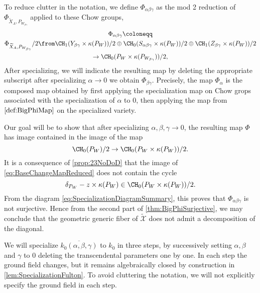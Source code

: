 To reduce clutter in the notation, we define $\Phi_{\alpha \beta \gamma}$ as the mod 2 reduction of $\Phi_{\widetilde{X}_A,P_{W_{\beta \gamma}}}$ applied to these Chow groups,
\begin{multline*}
   \Phi_{\alpha \beta \gamma} \coloneqq\\
\Phi_{\widetilde{X}_A,P_{W_{\beta \gamma}}}/2 \from \CH_1(Y_{\beta \gamma} \times \kappa(P_W))/2 \oplus \CH_0(S_{\alpha \beta \gamma}  \times \kappa(P_W))/2 \oplus \CH_1(Z_{\beta \gamma} \times \kappa(P_W))/2\\ 
\to \CH_0(P_W  \times \kappa(P_{W_{\beta \gamma}}))/2,
\end{multline*}
After specializing, we will indicate the resulting map by deleting the appropriate subscript \eg after specializing $\alpha \to 0$ we obtain $\Phi_{\beta \gamma}$. Precisely, the map $\Phi_\alpha$ is the composed map obtained by first applying the specialization map on Chow grops associated with the specialization of $\alpha$ to $0$, then applying the map from $\cref{def:BigPhiMap}$ on the specialized variety.

Our goal will be to show that after specializing $\alpha, \beta, \gamma \to 0$, the resulting map $\Phi$ has image contained in the image of the map
\begin{equation}
  \label{eq:BaseChangeMapReduced}
  \CH_0(P_W)/2 \to \CH_0(P_W \times \kappa(P_W))/2.
\end{equation}
It is a consequence of \cref{prop:23NoDoD} that the image of \eqref{eq:BaseChangeMapReduced} does not contain the cycle
\begin{equation}
  \label{eq:DiagonalCycle1}
  \delta_{P_W} - z \times \kappa(P_W) \in \CH_0(P_W \times \kappa(P_W))/2.
\end{equation}
From the diagram \eqref{eq:SpecializationDiagramSummary}, this proves that $\Phi_{\alpha \beta \gamma}$ is not surjective. Hence from the second part of \cref{thm:BigPhiSurjective}, we may conclude that the geometric generic fiber of $\widetilde{\mathcal{X}}$ does not admit a decomposition of the diagonal.

We will specialize $\overline{k_0(\alpha,\beta,\gamma)}$ to $k_0$ in three steps, by successively setting $\alpha, \beta$ and $\gamma$ to 0 \ie deleting the transcendental parameters one by one. In each step the ground field changes, but it remains algebraically closed by construction in \cref{lem:SpecializationFulton}. To avoid cluttering the notation, we will not explicitly specify the ground field in each step. 
